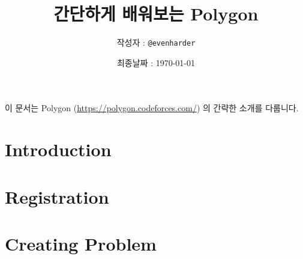 \documentclass{article}
\title{간단하게 배워보는 Polygon}
\author{작성자 : \texttt{@evenharder}}
\date{최종날짜 : \today}
\begin{document}
    \maketitle
    이 문서는 Polygon (\url{https://polygon.codeforces.com/}) 의 간략한 소개를 다룹니다.
    \tableofcontents
    \newpage
    \section{Introduction}
    
    \section{Registration}
    
    \section{Creating Problem}
    
\end{document}
